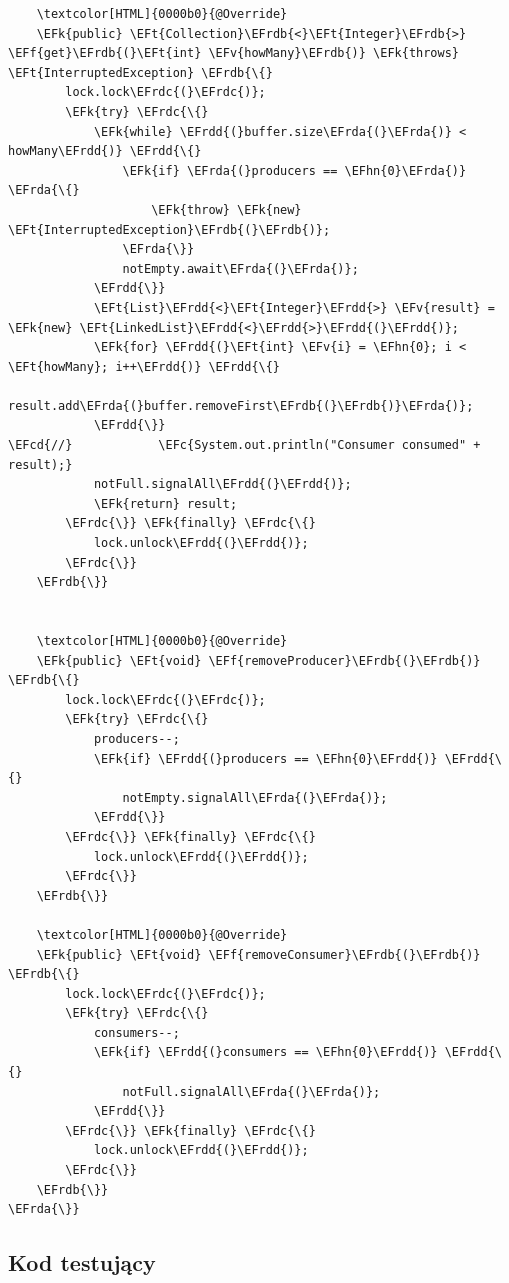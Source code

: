\documentclass[11pt]{article}
\newcommand{\EFc}[1]{\textcolor{EFc}{\textit{#1}}} %
\newcommand{\EFcd}[1]{\textcolor{EFcd}{\textit{#1}}} %
\newcommand{\EFk}[1]{\textcolor{EFk}{#1}} %
\newcommand{\EFf}[1]{\textcolor{EFf}{#1}} %
\newcommand{\EFv}[1]{\textcolor{EFv}{#1}} %
\newcommand{\EFt}[1]{\textcolor{EFt}{#1}} %
\newcommand{\EFhn}[1]{\textcolor{EFhn}{#1}} %
\newcommand{\EFrda}[1]{#1} %
\newcommand{\EFrdb}[1]{\textcolor{EFrdb}{#1}} %
\newcommand{\EFrdc}[1]{\textcolor{EFrdc}{#1}} %
\newcommand{\EFrdd}[1]{\textcolor{EFrdd}{#1}} %
\begin{document}
\begin{Code}
\begin{Verbatim}
    \textcolor[HTML]{0000b0}{@Override}
    \EFk{public} \EFt{Collection}\EFrdb{<}\EFt{Integer}\EFrdb{>} \EFf{get}\EFrdb{(}\EFt{int} \EFv{howMany}\EFrdb{)} \EFk{throws} \EFt{InterruptedException} \EFrdb{\{}
        lock.lock\EFrdc{(}\EFrdc{)};
        \EFk{try} \EFrdc{\{}
            \EFk{while} \EFrdd{(}buffer.size\EFrda{(}\EFrda{)} < howMany\EFrdd{)} \EFrdd{\{}
                \EFk{if} \EFrda{(}producers == \EFhn{0}\EFrda{)} \EFrda{\{}
                    \EFk{throw} \EFk{new} \EFt{InterruptedException}\EFrdb{(}\EFrdb{)};
                \EFrda{\}}
                notEmpty.await\EFrda{(}\EFrda{)};
            \EFrdd{\}}
            \EFt{List}\EFrdd{<}\EFt{Integer}\EFrdd{>} \EFv{result} = \EFk{new} \EFt{LinkedList}\EFrdd{<}\EFrdd{>}\EFrdd{(}\EFrdd{)};
            \EFk{for} \EFrdd{(}\EFt{int} \EFv{i} = \EFhn{0}; i < \EFt{howMany}; i++\EFrdd{)} \EFrdd{\{}
                result.add\EFrda{(}buffer.removeFirst\EFrdb{(}\EFrdb{)}\EFrda{)};
            \EFrdd{\}}
\EFcd{//}            \EFc{System.out.println("Consumer consumed" + result);}
            notFull.signalAll\EFrdd{(}\EFrdd{)};
            \EFk{return} result;
        \EFrdc{\}} \EFk{finally} \EFrdc{\{}
            lock.unlock\EFrdd{(}\EFrdd{)};
        \EFrdc{\}}
    \EFrdb{\}}


    \textcolor[HTML]{0000b0}{@Override}
    \EFk{public} \EFt{void} \EFf{removeProducer}\EFrdb{(}\EFrdb{)} \EFrdb{\{}
        lock.lock\EFrdc{(}\EFrdc{)};
        \EFk{try} \EFrdc{\{}
            producers--;
            \EFk{if} \EFrdd{(}producers == \EFhn{0}\EFrdd{)} \EFrdd{\{}
                notEmpty.signalAll\EFrda{(}\EFrda{)};
            \EFrdd{\}}
        \EFrdc{\}} \EFk{finally} \EFrdc{\{}
            lock.unlock\EFrdd{(}\EFrdd{)};
        \EFrdc{\}}
    \EFrdb{\}}

    \textcolor[HTML]{0000b0}{@Override}
    \EFk{public} \EFt{void} \EFf{removeConsumer}\EFrdb{(}\EFrdb{)} \EFrdb{\{}
        lock.lock\EFrdc{(}\EFrdc{)};
        \EFk{try} \EFrdc{\{}
            consumers--;
            \EFk{if} \EFrdd{(}consumers == \EFhn{0}\EFrdd{)} \EFrdd{\{}
                notFull.signalAll\EFrda{(}\EFrda{)};
            \EFrdd{\}}
        \EFrdc{\}} \EFk{finally} \EFrdc{\{}
            lock.unlock\EFrdd{(}\EFrdd{)};
        \EFrdc{\}}
    \EFrdb{\}}
\EFrda{\}}
\end{Verbatim}
\end{Code}
\subsection*{Kod testujący}
\label{sec:orgf30ed85}
\end{document}
